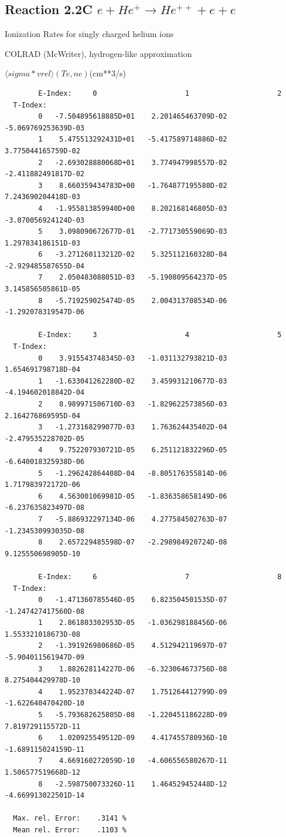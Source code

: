\documentclass[12pt,dvips]{article}
\begin{document}
\subsection{
Reaction 2.2C $e + He^+ \rightarrow He^{++}  + e  + e $
}
  Ionization Rates for singly charged helium ions

  COLRAD (McWriter), hydrogen-like approximation

$  \langle sigma*vrel \rangle(Te,ne) $(cm**3/s)

\begin{small}\begin{verbatim}
        E-Index:     0                     1                     2
  T-Index:
        0   -7.504895618885D+01    2.201465463709D-02   -5.069769253639D-03
        1    5.475513292431D+01   -5.417589714886D-02    3.775044165759D-02
        2   -2.693028880068D+01    3.774947998557D-02   -2.411882491817D-02
        3    8.660359434783D+00   -1.764877195580D-02    7.243690204418D-03
        4   -1.955813859940D+00    8.202168146805D-03   -3.070056924124D-03
        5    3.098090672677D-01   -2.771730559069D-03    1.297834186151D-03
        6   -3.271260113212D-02    5.325112160328D-04   -2.929485587655D-04
        7    2.050483088051D-03   -5.190809564237D-05    3.145856505861D-05
        8   -5.719259025474D-05    2.004313708534D-06   -1.292078319547D-06

        E-Index:     3                     4                     5
  T-Index:
        0    3.915543748345D-03   -1.031132793821D-03    1.654691798718D-04
        1   -1.633041262280D-02    3.459931210677D-03   -4.194602018842D-04
        2    8.989971506710D-03   -1.829622573856D-03    2.164276869595D-04
        3   -1.273168299077D-03    1.763624435402D-04   -2.479535228702D-05
        4    9.752207930721D-05    6.251121832296D-05   -6.640018325938D-06
        5   -1.296242864408D-04   -8.805176355814D-06    1.717983972172D-06
        6    4.563001069981D-05   -1.836358658149D-06   -6.237635823497D-08
        7   -5.886932297134D-06    4.277584502763D-07   -1.234530993035D-08
        8    2.657229485598D-07   -2.298984920724D-08    9.125550698905D-10

        E-Index:     6                     7                     8
  T-Index:
        0   -1.471360785546D-05    6.823504501535D-07   -1.247427417560D-08
        1    2.861803302953D-05   -1.036298188456D-06    1.553321018673D-08
        2   -1.391926980686D-05    4.512942119697D-07   -5.904011561947D-09
        3    1.882628114227D-06   -6.323064673756D-08    8.275404429978D-10
        4    1.952370344224D-07    1.751264412799D-09   -1.622640470420D-10
        5   -5.793682625805D-08   -1.220451186228D-09    7.819729115572D-11
        6    1.020925549512D-09    4.417455780936D-10   -1.689115024159D-11
        7    4.669160272059D-10   -4.606556580267D-11    1.506577519668D-12
        8   -2.598750073326D-11    1.464529452448D-12   -4.669913022501D-14

  Max. rel. Error:    .3141 %
  Mean rel. Error:    .1103 %

\end{verbatim}\end{small}
\end{document}
